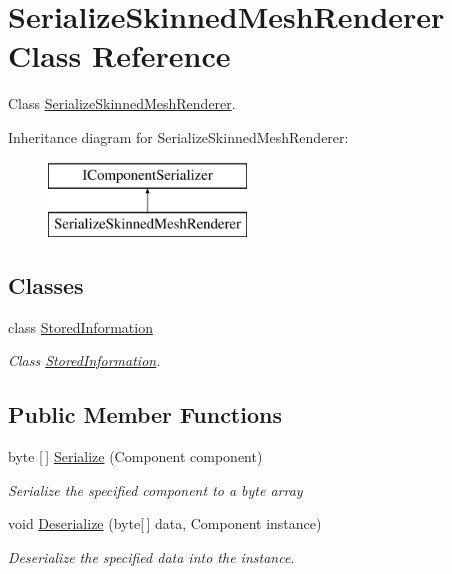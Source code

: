 \hypertarget{class_serialize_skinned_mesh_renderer}{}\section{Serialize\+Skinned\+Mesh\+Renderer Class Reference}
\label{class_serialize_skinned_mesh_renderer}


Class \hyperlink{class_serialize_skinned_mesh_renderer}{Serialize\+Skinned\+Mesh\+Renderer}.  


Inheritance diagram for Serialize\+Skinned\+Mesh\+Renderer\+:\begin{figure}[H]
\begin{center}
\leavevmode
\includegraphics[height=2.000000cm]{class_serialize_skinned_mesh_renderer}
\end{center}
\end{figure}
\subsection*{Classes}
\begin{DoxyCompactItemize}
\item 
class \hyperlink{class_serialize_skinned_mesh_renderer_1_1_stored_information}{Stored\+Information}
\begin{DoxyCompactList}\small\item\em Class \hyperlink{class_serialize_skinned_mesh_renderer_1_1_stored_information}{Stored\+Information}. \end{DoxyCompactList}\end{DoxyCompactItemize}
\subsection*{Public Member Functions}
\begin{DoxyCompactItemize}
\item 
byte \mbox{[}$\,$\mbox{]} \hyperlink{class_serialize_skinned_mesh_renderer_a5537c5f2cab4580a75bd8f6ef3ef331d}{Serialize} (Component component)
\begin{DoxyCompactList}\small\item\em Serialize the specified component to a byte array \end{DoxyCompactList}\item 
void \hyperlink{class_serialize_skinned_mesh_renderer_ae689a9e0a41aa23ec86f46bffa56b7b5}{Deserialize} (byte\mbox{[}$\,$\mbox{]} data, Component instance)
\begin{DoxyCompactList}\small\item\em Deserialize the specified data into the instance. \end{DoxyCompactList}\end{DoxyCompactItemize}
